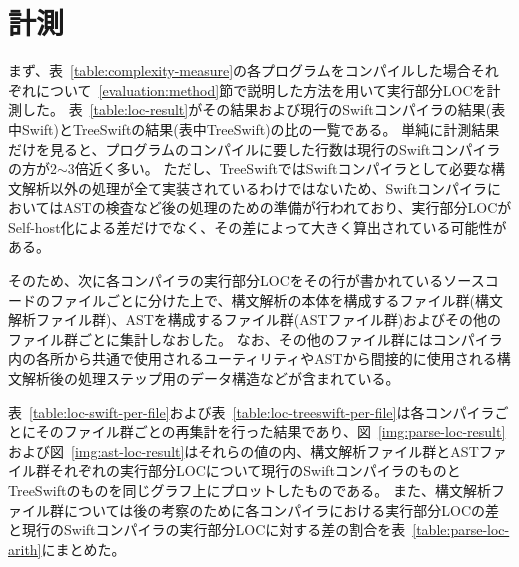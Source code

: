 \section{計測}
\label{evaluation:measure}

まず、表~\ref{table:complexity-measure}の各プログラムをコンパイルした場合それぞれについて~\ref{evaluation:method}節で説明した方法を用いて実行部分LOCを計測した。
表~\ref{table:loc-result}がその結果および現行のSwiftコンパイラの結果(表中Swift)とTreeSwiftの結果(表中TreeSwift)の比の一覧である。
単純に計測結果だけを見ると、プログラムのコンパイルに要した行数は現行のSwiftコンパイラの方が2$\sim$3倍近く多い。
ただし、TreeSwiftではSwiftコンパイラとして必要な構文解析以外の処理が全て実装されているわけではないため、SwiftコンパイラにおいてはASTの検査など後の処理のための準備が行われており、実行部分LOCがSelf-host化による差だけでなく、その差によって大きく算出されている可能性がある。

そのため、次に各コンパイラの実行部分LOCをその行が書かれているソースコードのファイルごとに分けた上で、構文解析の本体を構成するファイル群(構文解析ファイル群)、ASTを構成するファイル群(ASTファイル群)およびその他のファイル群ごとに集計しなおした。
なお、その他のファイル群にはコンパイラ内の各所から共通で使用されるユーティリティやASTから間接的に使用される構文解析後の処理ステップ用のデータ構造などが含まれている。

表~\ref{table:loc-swift-per-file}および表~\ref{table:loc-treeswift-per-file}は各コンパイラごとにそのファイル群ごとの再集計を行った結果であり、図~\ref{img:parse-loc-result}および図~\ref{img:ast-loc-result}はそれらの値の内、構文解析ファイル群とASTファイル群それぞれの実行部分LOCについて現行のSwiftコンパイラのものとTreeSwiftのものを同じグラフ上にプロットしたものである。
また、構文解析ファイル群については後の考察のために各コンパイラにおける実行部分LOCの差と現行のSwiftコンパイラの実行部分LOCに対する差の割合を表~\ref{table:parse-loc-arith}にまとめた。

